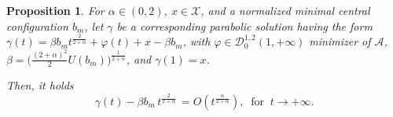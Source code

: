 \documentclass[10pt,a4paper]{amsart}
\newtheorem{prop}{Proposition}
\begin{document}
\begin{prop}
\label{prop:asymptotic_par}
    For $\alpha \in (0,2)$, $x \in \mathcal X$, and a normalized minimal central configuration $b_m$, let $\gamma$ be a corresponding parabolic solution having the form $\gamma(t) = \beta b_mt^{\frac{2}{2+\alpha}}+\varphi(t)+x-\beta b_m$, with $\varphi\in\mathcal{D}_0^{1,2}(1,+\infty)$ minimizer of $\mathcal A$, $\beta = \big({\frac{(2+\alpha)^2}{2}U(b_m)}\big)^{\frac{1}{2+\alpha}}$, and $\gamma(1)=x$. 
    
    Then, it holds
    \begin{equation}
    \label{eq:asymp}
    \gamma(t)-\beta b_m\,t^\frac{2}{2+\alpha}\,  =O(t^\frac{\alpha}{2+\alpha}), \ \mbox{ for } \ t \rightarrow+\infty.
    \end{equation}
\end{prop}
\end{document}

